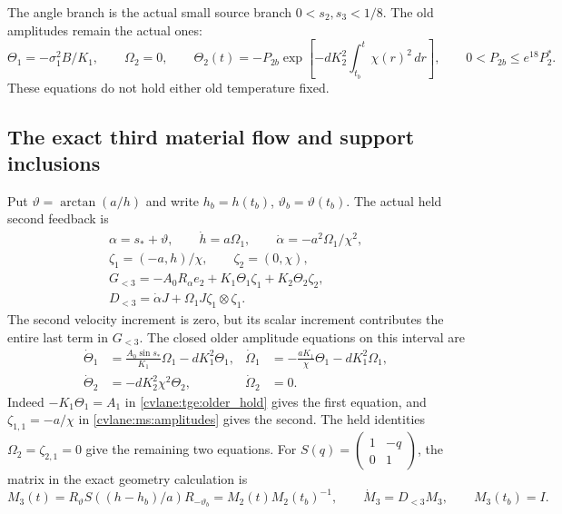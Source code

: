 The angle branch is the actual small source branch $0<s_2,s_3<1/8$.
The old amplitudes remain the actual ones:
\[
 \Theta_1=-\sigma_1^2B/K_1,\qquad
 \Omega_2=0,\qquad
 \Theta_2(t)=-P_{2b}\exp\!\left[-dK_2^2
                 \int_{t_b}^{t}\chi(r)^2\,dr\right],
 \qquad0<P_{2b}\leq e^{18}P_2^*.
\]
These equations do not hold either old temperature fixed.

\subsection{The exact third material flow and support inclusions}

Put $\vartheta=\arctan(a/h)$ and write $h_b=h(t_b)$,
$\vartheta_b=\vartheta(t_b)$. The actual held second feedback is
\begin{equation}\label{cvlane:tgs:parents}
 \begin{gathered}
 \alpha=s_*+\vartheta,\qquad
 \dot h=a\Omega_1,\qquad
 \dot\alpha=-a^2\Omega_1/\chi^2,\\
 \zeta_1=(-a,h)/\chi,\qquad\zeta_2=(0,\chi),\\
 G_{<3}=-A_0R_\alpha e_2+K_1\Theta_1\zeta_1
                                  +K_2\Theta_2\zeta_2,\\
 D_{<3}=\dot\alpha J+\Omega_1J\zeta_1\otimes\zeta_1.
 \end{gathered}
\end{equation}
The second velocity increment is zero, but its scalar increment
contributes the entire last term in $G_{<3}$.
The closed older amplitude equations on this interval are
\begin{equation}\label{cvlane:tgs:olderpair}
 \begin{aligned}
 \dot\Theta_1&=\frac{A_0\sin s_*}{K_1}\Omega_1-dK_1^2\Theta_1,
 &\dot\Omega_1&=-\frac{aK_1}{\chi}\Theta_1-dK_1^2\Omega_1,\\
 \dot\Theta_2&=-dK_2^2\chi^2\Theta_2,
 &\dot\Omega_2&=0.
 \end{aligned}
\end{equation}
Indeed $-K_1\Theta_1=A_1$ in \eqref{cvlane:tge:older_hold}
gives the first equation, and $\zeta_{1,1}=-a/\chi$ in
\eqref{cvlane:ms:amplitudes} gives the second. The held identities
$\Omega_2=\zeta_{2,1}=0$ give the remaining two equations.
For $S(q)=\left(\begin{smallmatrix}1&-q\\0&1\end{smallmatrix}\right)$,
the matrix in the exact geometry calculation is
\begin{equation}\label{cvlane:tgs:flow}
 M_3(t)=R_\vartheta S((h-h_b)/a)R_{-\vartheta_b}
       =M_2(t)M_2(t_b)^{-1},\qquad
 \dot M_3=D_{<3}M_3,\qquad M_3(t_b)=I.
\end{equation}
